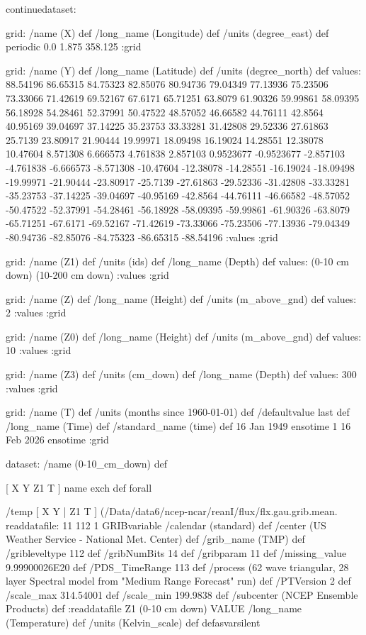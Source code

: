 \begin{ingrid}

continuedataset:

grid:
/name (X) def
/long_name (Longitude) def
/units (degree_east) def
periodic
0.0 1.875 358.125
:grid

grid:
/name (Y) def
/long_name (Latitude) def
/units (degree_north) def
values: 88.54196 86.65315 84.75323 82.85076 80.94736 79.04349 77.13936 75.23506 73.33066 71.42619 69.52167 67.6171 65.71251 63.8079 61.90326 59.99861 58.09395 56.18928 54.28461 52.37991 50.47522 48.57052 46.66582 44.76111 42.8564 40.95169 39.04697 37.14225 35.23753 33.33281 31.42808 29.52336 27.61863 25.7139 23.80917 21.90444 19.99971 18.09498 16.19024 14.28551 12.38078 10.47604 8.571308 6.666573 4.761838 2.857103 0.9523677 -0.9523677 -2.857103 -4.761838 -6.666573 -8.571308 -10.47604 -12.38078 -14.28551 -16.19024 -18.09498 -19.99971 -21.90444 -23.80917 -25.7139 -27.61863 -29.52336 -31.42808 -33.33281 -35.23753 -37.14225 -39.04697 -40.95169 -42.8564 -44.76111 -46.66582 -48.57052 -50.47522 -52.37991 -54.28461 -56.18928 -58.09395 -59.99861 -61.90326 -63.8079 -65.71251 -67.6171 -69.52167 -71.42619 -73.33066 -75.23506 -77.13936 -79.04349 -80.94736 -82.85076 -84.75323 -86.65315 -88.54196 :values
:grid

grid:
/name (Z1) def
/units (ids) def
/long_name (Depth) def
values: (0-10 cm down) (10-200 cm down) :values
:grid

grid:
/name (Z) def
/long_name (Height) def
/units (m_above_gnd) def
values: 2 :values
:grid

grid:
/name (Z0) def
/long_name (Height) def
/units (m_above_gnd) def
values: 10 :values
:grid

grid:
/name (Z3) def
/units (cm_down) def
/long_name (Depth) def
values: 300 :values
:grid

grid:
/name (T) def
/units (months since 1960-01-01) def
/defaultvalue { last } def
/long_name (Time) def
/standard_name (time) def
16 Jan 1949 ensotime
1
16 Feb 2026 ensotime 
:grid


 dataset: /name (0-10_cm_down) def

  [ X Y Z1 T ] { name exch def } forall

  /temp { [ X Y | Z1 T ] (/Data/data6/ncep-ncar/reanI/flux/flx.gau.grib.mean.%
  readdatafile:
  11 112 1 GRIBvariable
  /calendar (standard) def
  /center (US Weather Service - National Met. Center) def
  /grib_name (TMP) def
  /gribleveltype 112 def
  /gribNumBits 14 def
  /gribparam 11 def
  /missing_value 9.99900026E20 def
  /PDS_TimeRange 113 def
  /process (62 wave triangular, 28 layer Spectral model from "Medium Range Forecast" run) def
  /PTVersion 2 def
  /scale_max 314.54001 def
  /scale_min 199.9838 def
  /subcenter (NCEP Ensemble Products) def
  :readdatafile
  Z1 (0-10 cm down) VALUE
  /long_name (Temperature) def
  /units (Kelvin_scale) def
  } defasvarsilent 


\end{ingrid}
